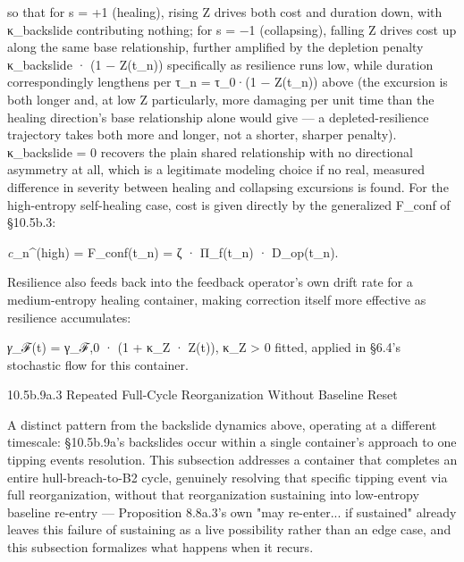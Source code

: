 \documentclass[
]{article}
\begin{document}
so that for s = +1 (healing), rising Z drives both cost and duration
down, with κ\_backslide contributing nothing; for s = −1 (collapsing),
falling Z drives cost up along the same base relationship, further
amplified by the depletion penalty κ\_backslide · (1 − Z(t\_n))
specifically as resilience runs low, while duration correspondingly
lengthens per τ\_n = τ\_0·(1 − Z(t\_n)) above (the excursion is both
longer and, at low Z particularly, more damaging per unit time than the
healing direction's base relationship alone would give --- a
depleted-resilience trajectory takes both more and longer, not a
shorter, sharper penalty). κ\_backslide = 0 recovers the plain shared
relationship with no directional asymmetry at all, which is a legitimate
modeling choice if no real, measured difference in severity between
healing and collapsing excursions is found. For the high-entropy
self-healing case, cost is given directly by the generalized F\_conf of
§10.5b.3:

\emph{c}\_n\^{}(high) = F\_conf(t\_n) = ζ · Π\_f(t\_n) · D\_op(t\_n).

Resilience also feeds back into the feedback operator's own drift rate
for a medium-entropy healing container, making correction itself more
effective as resilience accumulates:

\emph{γ}\_ℱ(t) = γ\_ℱ,0 · (1 + κ\_Z · Z(t)), κ\_Z \textgreater{} 0
fitted, applied in §6.4's stochastic flow for this container.

10.5b.9a.3 Repeated Full-Cycle Reorganization Without Baseline Reset

A distinct pattern from the backslide dynamics above, operating at a
different timescale: §10.5b.9a's backslides occur within a single
container's approach to one tipping events resolution. This subsection
addresses a container that completes an entire hull-breach-to-B2 cycle,
genuinely resolving that specific tipping event via full reorganization,
without that reorganization sustaining into low-entropy baseline
re-entry --- Proposition 8.8a.3's own "may re-enter... if sustained"
already leaves this failure of sustaining as a live possibility rather
than an edge case, and this subsection formalizes what happens when it
recurs.
\end{document}
